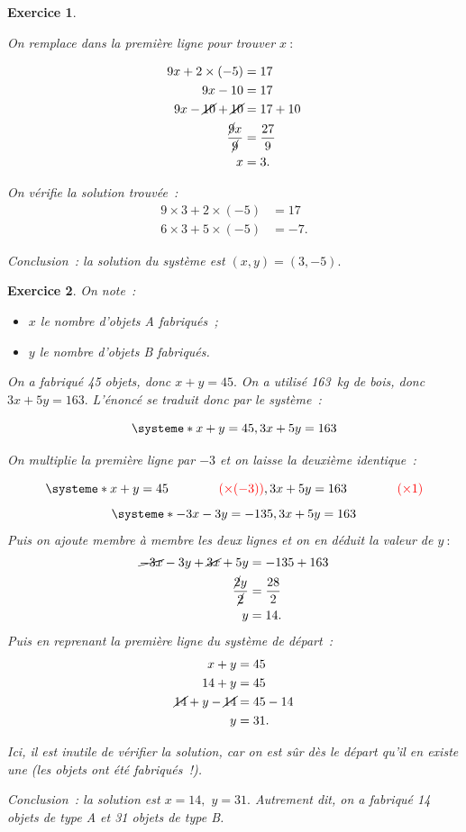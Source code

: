 \documentclass[10pt]{article}
\newtheorem{exo}{Exercice}
\begin{document}
\begin{exo}
\begin{enumerate}
On remplace dans la première ligne pour trouver $x~:$

\begin{align*}
9x+2\times (-5)&=17\\
9x-10&=17\\
9x-\cancel{10}+\cancel{10}&=17+10\\
\frac{\cancel{9}x}{\cancel{9}}&=\frac{27}{9}\\
x&=3.\end{align*}

On vérifie la solution trouvée~:
\begin{align*}9\times 3+2\times (-5)&=17\\6\times 3+5\times (-5)&=-7.\end{align*}


Conclusion~: la solution du système est $(x,y)=(3,-5).$
\end{enumerate}

\end{exo}

\begin{exo}


On note~:

\begin{itemize}
\item[\textbullet] $x$ le nombre d'objets A fabriqués~;
\item[\textbullet] $y$ le nombre d'objets B fabriqués.
\end{itemize}

\medskip

On a fabriqué 45 objets, donc $x+y=45.$ On a utilisé 163~kg de bois, donc $3x+5y=163.$ L'énoncé se traduit donc par le système~:

\[
\systeme*{x+y=45,3x+5y=163}
\]

On multiplie la première ligne par $-3$ et on laisse la deuxième identique~:

\[
\systeme*{x+y=45\qquad \textcolor{red}{\qquad (\times (-3))},3x+5y=163 \qquad \textcolor{red}{\qquad (\times 1)}}
\]
\[
\systeme*{-3x-3y=-135,3x+5y=163}
\]
Puis on ajoute membre à membre les deux lignes et on en déduit la valeur de $y~:$
\begin{align*}
\cancel{-3x}-3y+\cancel{3x}+5y&=-135+163\\
\frac{\cancel{2}y}{\cancel{2}}&=\frac{28}{2}\\
y&=14.\end{align*} 
Puis en reprenant la première ligne du système de départ~:
\begin{align*}
x+y&=45\\
14+y&=45\\
\cancel{14}+y-\cancel{14}&=45-14\\
y&=31.\end{align*}

\medskip

Ici, il est inutile de vérifier la solution, car on est sûr dès le départ qu'il en existe une (les objets ont été fabriqués~!).

Conclusion~: la solution est $x=14,$ $y=31.$ Autrement dit, on a fabriqué 14 objets de type A et 31 objets de type B.

\end{exo}
\end{document}
